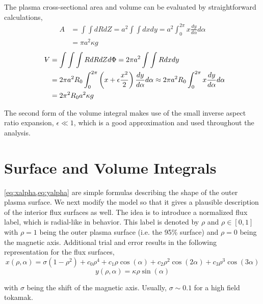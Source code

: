 The plasma cross-sectional area and volume can be evaluated by straightforward calculations,
\begin{equation}
\begin{split}
	A & = \int \int dR dZ = a^2 \int \int dx dy = a^2 \int_0^{2 \pi} x \frac{dy}{d\alpha} d\alpha \\ & = \pi a^2 \kappa g
\end{split}
\end{equation}
\begin{equation}
\begin{split}
	\volume & = \int \int \int R dR dZ d\Phi = 2 \pi a^2 \int \int R dx dy \\ & = 2 \pi a^2 R_0 \int_0^{2 \pi} \left( x + \epsilon \frac{ x^2 }{ 2} \right) \frac{dy}{d\alpha} d\alpha \approx 2 \pi a^2 R_0 \int_0^{2 \pi} x \frac{dy}{d\alpha} d\alpha \\ & = 2 \pi^2 R_0 a^2 \kappa g
\end{split}
\end{equation}

The second form of the volume integral makes use of the small inverse aspect ratio expansion, $\epsilon \ll 1 $, which is a good approximation and used throughout the analysis.

\section{Surface and Volume Integrals}

\cref{eq:xalpha,eq:yalpha} are simple formulas describing the shape of the outer plasma surface. We next modify the model so that it gives a plausible description of the interior flux surfaces as well. The idea is to introduce a normalized flux label, which is radial-like in behavior. This label is denoted by $\rho$ and $\rho \in [0,1]$ with $\rho = 1$ being the outer plasma surface (i.e. the 95\% surface) and $\rho = 0$ being the magnetic axis. Additional trial and error results in the following representation for the flux surfaces,
\begin{equation}
	x(\rho,\alpha) = \sigma( 1 - \rho^2 ) + c_0 \rho^4 + c_1 \rho \cos(\alpha) + c_2 \rho^2 \cos(2\alpha) + 
		c_3 \rho^3 \cos(3\alpha)
\end{equation}
\begin{equation}
	y(\rho, \alpha) = \kappa \rho \sin(\alpha)
\end{equation}

with $\sigma$ being the shift of the magnetic axis. Usually, $\sigma \sim 0.1$ for a high field tokamak.

